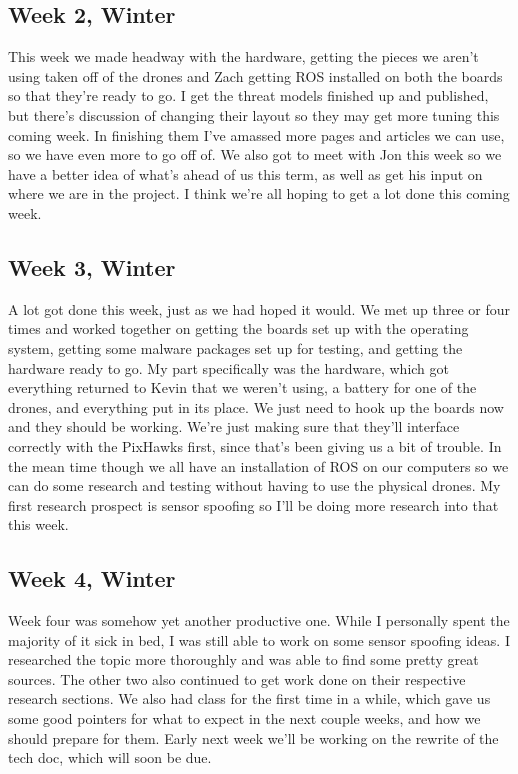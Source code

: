 \documentclass[IEEEtran,letterpaper,10pt,notitlepage,draftclsnofoot,onecolumn]{article}
\begin{document}
\begin{sloppypar}
\subsection{Week 2, Winter}
This week we made headway with the hardware, getting the pieces we aren't using taken off of the drones and Zach getting ROS installed on both the boards so that they're ready to go. I get the threat models finished up and published, but there's discussion of changing their layout so they may get more tuning this coming week. In finishing them I've amassed more pages and articles we can use, so we have even more to go off of. We also got to meet with Jon this week so we have a better idea of what's ahead of us this term, as well as get his input on where we are in the project. I think we're all hoping to get a lot done this coming week.
\subsection{Week 3, Winter}
A lot got done this week, just as we had hoped it would. We met up three or four times and worked together on getting the boards set up with the operating system, getting some malware packages set up for testing, and getting the hardware ready to go. My part specifically was the hardware, which got everything returned to Kevin that we weren't using, a battery for one of the drones, and everything put in its place. We just need to hook up the boards now and they should be working. We're just making sure that they'll interface correctly with the PixHawks first, since that's been giving us a bit of trouble. In the mean time though we all have an installation of ROS on our computers so we can do some research and testing without having to use the physical drones. My first research prospect is sensor spoofing so I'll be doing more research into that this week.
\subsection{Week 4, Winter}
Week four was somehow yet another productive one. While I personally spent the majority of it sick in bed, I was still able to work on some sensor spoofing ideas. I researched the topic more thoroughly and was able to find some pretty great sources. The other two also continued to get work done on their respective research sections. We also had class for the first time in a while, which gave us some good pointers for what to expect in the next couple weeks, and how we should prepare for them. Early next week we'll be working on the rewrite of the tech doc, which will soon be due.

\end{sloppypar}
\end{document}
